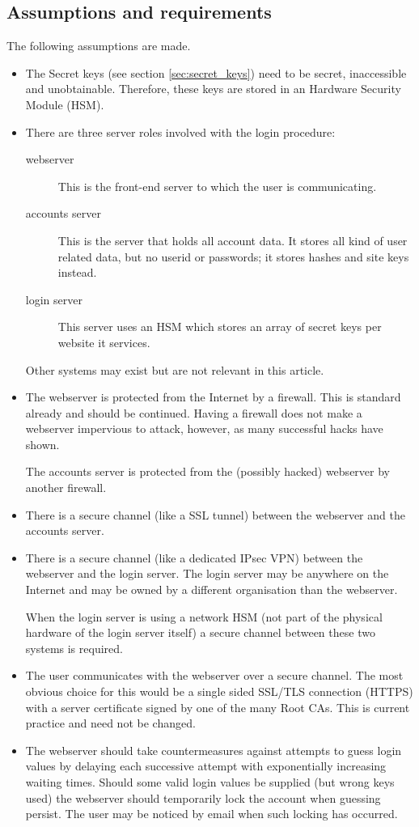 \subsection{Assumptions and requirements}
The following assumptions are made.
\begin{itemize}
\item	The Secret keys (see section \ref{sec:secret_keys})
need to be secret, inaccessible and unobtainable.
Therefore, these keys are stored in an Hardware Security Module (HSM).
\item	There are three server roles involved with the login procedure:
	\begin{description}
	\item[webserver]	This is the front-end server to which the user is communicating.
	\item[accounts server]	This is the server that holds all account data.
			It stores all kind of user related data, but no userid or passwords;
			it stores hashes and site keys instead.
	\item[login server]	This server uses an HSM which stores an array of secret keys per website it services.
	\end{description}
	Other systems may exist but are not relevant in this article.
\item	The webserver is protected from the Internet by a firewall.
	This is standard already and should be continued.
	Having a firewall does not make a webserver impervious to attack,
	however,
	as many successful hacks have shown.
\par	The accounts server is protected from the
	(possibly hacked)
	webserver by another firewall.
\item	There is a secure channel
	(like a SSL tunnel)
	between the webserver and the accounts server.
\item	There is a secure channel
	(like a dedicated IPsec VPN)
	between the webserver and the login server.
	The login server may be anywhere on the Internet and may be owned by a different organisation than the webserver.
\par	When the login server is using a network HSM
	(not part of the physical hardware of the login server itself)
	a secure channel between these two systems is required.
\item	The user communicates with the webserver over a secure channel.
	The most obvious choice for this would be a single sided SSL/TLS connection
	(HTTPS)
	with a server certificate signed by one of the many Root CAs.
	This is current practice and need not be changed.
\item	The webserver should take countermeasures against attempts to guess
	login values by delaying each successive attempt with exponentially increasing waiting times.
	Should some valid login values be supplied
	(but wrong keys used)
	the webserver should temporarily lock the account when guessing persist.
	The user may be noticed by email when such locking has occurred.
\end{itemize}
